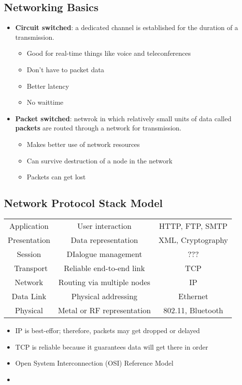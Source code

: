 \subsection{Networking Basics}
\begin{itemize}
	\item \textbf{Circuit switched}: a dedicated channel is established for the duration of a transmission.
	\begin{itemize}
		\item Good for real-time things like voice and teleconferences
		\item Don't have to packet data
		\item Better latency
		\item No waittime
	\end{itemize}
	\item \textbf{Packet switched}: netwrok in which relatively small units of data called \textbf{packets} are routed through a network for transmission.
	\begin{itemize}
		\item Makes better use of network resources
		\item Can survive destruction of a node in the network
		\item Packets can get lost
	\end{itemize}
\end{itemize}

\subsection{Network Protocol Stack Model}
\begin{center}
\begin{tabular}{c | c c}
	Application & User interaction & HTTP, FTP, SMTP\\
	Presentation & Data representation & XML, Cryptography \\
	Session & DIalogue management & ??? \\\
	Transport & Reliable end-to-end link & TCP \\
	Network & Routing via multiple nodes & IP \\
	Data Link & Physical addressing & Ethernet \\
	Physical & Metal or RF representation & 802.11, Bluetooth
\end{tabular}
\end{center}
\begin{itemize}
	\item IP is best-effor; therefore, packets may get dropped or delayed
	\item TCP is reliable because it guarantees data will get there in order
	\item Open System Interconnection (OSI) Reference Model
	\item 
\end{itemize}


